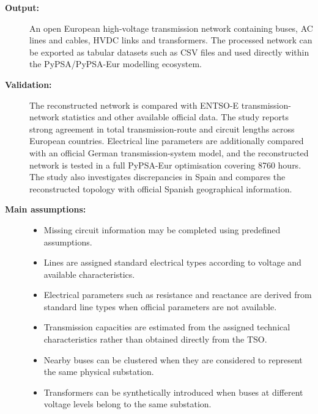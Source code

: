\begin{description}
    \item[\textbf{Output:}]
    An open European high-voltage transmission network containing buses,
    AC lines and cables, HVDC links and transformers. The processed network
    can be exported as tabular datasets such as CSV files and used directly
    within the PyPSA/PyPSA-Eur modelling ecosystem.

    \item[\textbf{Validation:}]
    The reconstructed network is compared with ENTSO-E transmission-network
    statistics and other available official data. The study reports strong
    agreement in total transmission-route and circuit lengths across European
    countries. Electrical line parameters are additionally compared with an
    official German transmission-system model, and the reconstructed network
    is tested in a full PyPSA-Eur optimisation covering 8760 hours. The study
    also investigates discrepancies in Spain and compares the reconstructed
    topology with official Spanish geographical information.

    \item[\textbf{Main assumptions:}] \hfill
    \begin{itemize}
        \item Missing circuit information may be completed using predefined
        assumptions.
        \item Lines are assigned standard electrical types according to
        voltage and available characteristics.
        \item Electrical parameters such as resistance and reactance are
        derived from standard line types when official parameters are not
        available.
        \item Transmission capacities are estimated from the assigned
        technical characteristics rather than obtained directly from the TSO.
        \item Nearby buses can be clustered when they are considered to
        represent the same physical substation.
        \item Transformers can be synthetically introduced when buses at
        different voltage levels belong to the same substation.
    \end{itemize}


\end{description}
